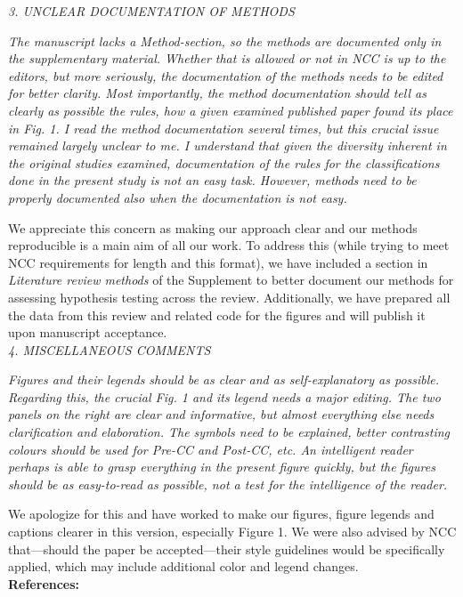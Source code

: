 \documentclass[11pt]{article}
\begin{document}
\emph{3. UNCLEAR DOCUMENTATION OF METHODS}

\emph{The manuscript lacks a Method-section, so the methods are documented only in the supplementary material. Whether that is allowed or not in NCC is up to the editors, but more seriously, the documentation of the methods needs to be edited for better clarity. Most importantly, the method documentation should tell as clearly as possible the rules, how a given examined published paper found its place in Fig. 1. I read the method documentation several times, but this crucial issue remained largely unclear to me. I understand that given the diversity inherent in the original studies examined, documentation of the rules for the classifications done in the present study is not an easy task. However, methods need to be properly documented also when the documentation is not easy.}

We appreciate this concern as making our approach clear and our methods reproducible is a main aim of all our work. To address this (while trying to meet NCC requirements for length and this format), we have included a section in \emph{Literature review methods} of the Supplement to better document our methods for assessing hypothesis testing across the review. Additionally, we have prepared all the data from this review and related code for the figures and will publish it upon manuscript acceptance. \\

\emph{4. MISCELLANEOUS COMMENTS}

\emph{Figures and their legends should be as clear and as self-explanatory as possible. Regarding this, the crucial Fig. 1 and its legend needs a major editing. The two panels on the right are clear and informative, but almost everything else needs clarification and elaboration. The symbols need to be explained, better contrasting colours should be used for Pre-CC and Post-CC, etc. An intelligent reader perhaps is able to grasp everything in the present figure quickly, but the figures should be as easy-to-read as possible, not a test for the intelligence of the reader.}

We apologize for this and have worked to make our figures, figure legends and captions clearer in this version, especially Figure 1. We were also advised by NCC that---should the paper be accepted---their style guidelines would be specifically applied, which may include additional color and legend changes. \\

\newpage
{\bf References:}

\end{document}
